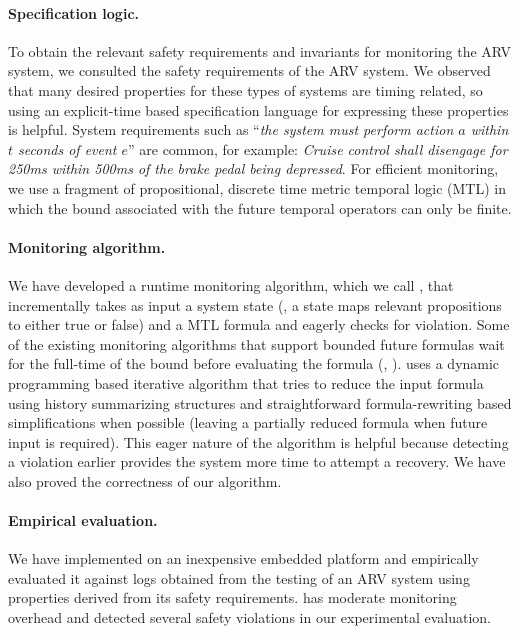 \paragraph{Specification logic.}
To obtain the relevant safety requirements and invariants for monitoring the ARV system, we consulted the safety requirements of the ARV system. 
We observed that many desired properties for these types of systems are timing related, so using an explicit-time based specification language for expressing these properties is helpful. 
System requirements such as ``\emph{the system must perform action $a$ within $t$ seconds of event $e$}'' are common, 
%
for example: \emph{Cruise control shall disengage for 250ms within 500ms of the brake pedal being depressed}.
%
For efficient monitoring, we use a fragment of propositional, discrete time metric temporal logic (MTL)\cite{Koymans1990} in which the bound associated with the future temporal operators can only be finite. %

\paragraph{Monitoring algorithm.}
We have developed a runtime monitoring algorithm, which we call \monitor, that incrementally takes as input a system state (\ie, a state maps relevant propositions to either true or false) and a MTL formula and eagerly checks for violation. 
Some of the existing monitoring algorithms that support bounded future formulas wait for the full-time of the bound before evaluating the formula (\eg, \cite{Basin2008}). 
\monitor uses a dynamic programming based iterative algorithm that tries to reduce the input formula using history summarizing structures and straightforward formula-rewriting based simplifications when possible (leaving a partially reduced formula when future input is required).
This eager nature of the algorithm is helpful because detecting a violation earlier provides the system more time to attempt a recovery. We have also proved the correctness of our algorithm. 

\paragraph{Empirical evaluation.} 
We have implemented \monitor on an inexpensive embedded platform and empirically evaluated it against logs obtained from the testing of an ARV system using properties derived from its safety requirements.
\monitor has moderate monitoring overhead and detected several safety violations in our experimental evaluation.  


